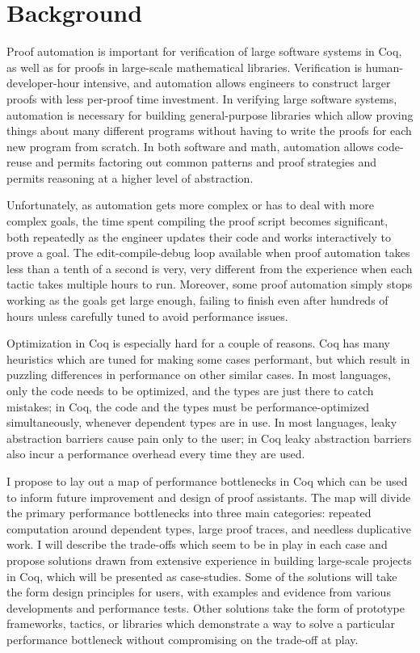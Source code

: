 \documentclass[twoside]{article}
\begin{document}
\section{Background}

Proof automation is important for verification of large software systems in Coq, as well as for proofs in large-scale mathematical libraries.
Verification is human-developer-hour intensive, and automation allows engineers to construct larger proofs with less per-proof time investment.
In verifying large software systems, automation is necessary for building general-purpose libraries which allow proving things about many different programs without having to write the proofs for each new program from scratch.
In both software and math, automation allows code-reuse and permits factoring out common patterns and proof strategies and permits reasoning at a higher level of abstraction.

Unfortunately, as automation gets more complex or has to deal with more complex goals, the time spent compiling the proof script becomes significant, both repeatedly as the engineer updates their code and works interactively to prove a goal.
The edit-compile-debug loop available when proof automation takes less than a tenth of a second is very, very different from the experience when each tactic takes multiple hours to run.
Moreover, some proof automation simply stops working as the goals get large enough, failing to finish even after hundreds of hours unless carefully tuned to avoid performance issues.

Optimization in Coq is especially hard for a couple of reasons.
Coq has many heuristics which are tuned for making some cases performant, but which result in puzzling differences in performance on other similar cases.
In most languages, only the code needs to be optimized, and the types are just there to catch mistakes;
in Coq, the code and the types must be performance-optimized simultaneously, whenever dependent types are in use.
In most languages, leaky abstraction barriers cause pain only to the user;
in Coq leaky abstraction barriers also incur a performance overhead every time they are used.

I propose to lay out a map of performance bottlenecks in Coq which can be used to inform future improvement and design of proof assistants.
The map will divide the primary performance bottlenecks into three main categories: repeated computation around dependent types, large proof traces, and needless duplicative work.
I will describe the trade-offs which seem to be in play in each case and propose solutions drawn from extensive experience in building large-scale projects in Coq, which will be presented as case-studies.
Some of the solutions will take the form design principles for users, with examples and evidence from various developments and performance tests.
Other solutions take the form of prototype frameworks, tactics, or libraries which demonstrate a way to solve a particular performance bottleneck without compromising on the trade-off at play.
\end{document}
